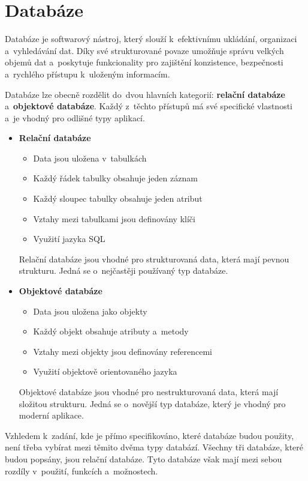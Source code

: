 \newpage

\section{Databáze}
Databáze je softwarový nástroj, který slouží k~efektivnímu ukládání, organizaci a~vyhledávání dat. 
Díky své strukturované povaze umožňuje správu velkých objemů dat a~poskytuje funkcionality pro 
zajištění konzistence, bezpečnosti a~rychlého přístupu k~uloženým informacím.

Databáze lze obecně rozdělit do~dvou hlavních kategorií: \textbf{relační databáze} a~\textbf{objektové databáze}. 
Každý z~těchto přístupů má své specifické vlastnosti a~je vhodný pro odlišné typy aplikací.

\newpage

\begin{itemize}
    \item \textbf{Relační databáze}
    \begin{itemize}[itemsep=-1pt]
        \item Data jsou uložena v~tabulkách
        \item Každý řádek tabulky obsahuje jeden záznam
        \item Každý sloupec tabulky obsahuje jeden atribut
        \item Vztahy mezi tabulkami jsou definovány klíči
        \item Využití jazyka SQL
    \end{itemize}
    Relační databáze jsou vhodné pro strukturovaná data, která mají pevnou strukturu.
    Jedná se o~nejčastěji používaný typ databáze.

    \item \textbf{Objektové databáze}
    \begin{itemize}[itemsep=-1pt]
        \item Data jsou uložena jako objekty
        \item Každý objekt obsahuje atributy a~metody
        \item Vztahy mezi objekty jsou definovány referencemi
        \item Využití objektově orientovaného jazyka
    \end{itemize}
    Objektové databáze jsou vhodné pro nestrukturovaná data, která mají složitou strukturu.
    Jedná se o~novější typ databáze, který je vhodný pro moderní aplikace.
\end{itemize}

Vzhledem k~zadání, kde je přímo specifikováno, které databáze budou použity,
není třeba vybírat mezi těmito dvěma typy databází. Všechny tři databáze, které budou popsány,
jsou relační databáze. Tyto databáze však mají mezi sebou rozdíly v~použití, funkcích a~možnostech.

